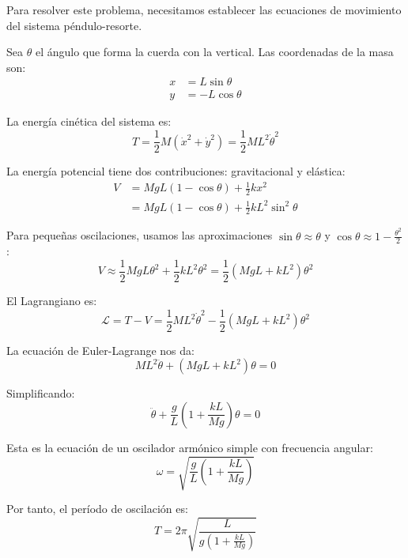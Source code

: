 \documentclass[
  11pt,
  letterpaper,
   addpoints,
   answers
  ]{exam}
\begin{document}
\begin{questions}
\begin{solution}
  Para resolver este problema, necesitamos establecer las ecuaciones de movimiento del sistema péndulo-resorte.
  
  Sea $\theta$ el ángulo que forma la cuerda con la vertical. Las coordenadas de la masa son:
  \begin{align}
    x &= L\sin\theta \\
    y &= -L\cos\theta
  \end{align}
  
  La energía cinética del sistema es:
  \begin{equation}
    T = \frac{1}{2}M(\dot{x}^2 + \dot{y}^2) = \frac{1}{2}ML^2\dot{\theta}^2
  \end{equation}
  
  La energía potencial tiene dos contribuciones: gravitacional y elástica:
  \begin{align}
    V &= MgL(1-\cos\theta) + \frac{1}{2}kx^2 \\
    &= MgL(1-\cos\theta) + \frac{1}{2}kL^2\sin^2\theta
  \end{align}
  
  Para pequeñas oscilaciones, usamos las aproximaciones $\sin\theta \approx \theta$ y $\cos\theta \approx 1 - \frac{\theta^2}{2}$:
  \begin{equation}
    V \approx \frac{1}{2}MgL\theta^2 + \frac{1}{2}kL^2\theta^2 = \frac{1}{2}(MgL + kL^2)\theta^2
  \end{equation}
  
  El Lagrangiano es:
  \begin{equation}
    \mathcal{L} = T - V = \frac{1}{2}ML^2\dot{\theta}^2 - \frac{1}{2}(MgL + kL^2)\theta^2
  \end{equation}
  
  La ecuación de Euler-Lagrange nos da:
  \begin{equation}
    ML^2\ddot{\theta} + (MgL + kL^2)\theta = 0
  \end{equation}
  
  Simplificando:
  \begin{equation}
    \ddot{\theta} + \frac{g}{L}\left(1 + \frac{kL}{Mg}\right)\theta = 0
  \end{equation}
  
  Esta es la ecuación de un oscilador armónico simple con frecuencia angular:
  \begin{equation}
    \omega = \sqrt{\frac{g}{L}\left(1 + \frac{kL}{Mg}\right)}
  \end{equation}
  
  Por tanto, el período de oscilación es:
  \begin{equation}
    \boxed{T = 2\pi\sqrt{\frac{L}{g\left(1 + \frac{kL}{Mg}\right)}}}
  \end{equation}
  

\end{solution}
\end{questions}
\end{document}
